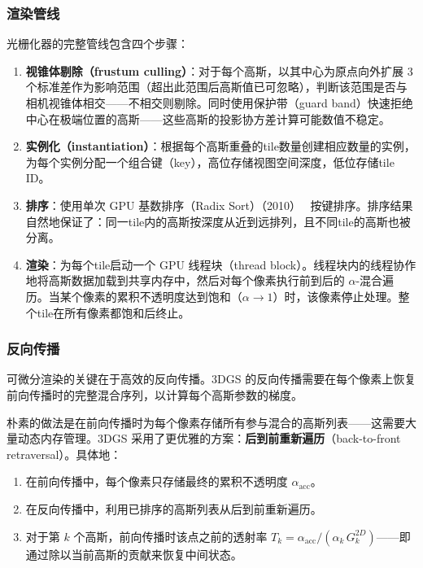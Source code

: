 \subsubsection{渲染管线}

光栅化器的完整管线包含四个步骤：

\begin{enumerate}
\item \textbf{视锥体剔除（frustum culling）}：对于每个高斯，以其中心为原点向外扩展 3 个标准差作为影响范围（超出此范围后高斯值已可忽略），判断该范围是否与相机视锥体相交——不相交则剔除。同时使用保护带（guard band）快速拒绝中心在极端位置的高斯——这些高斯的投影协方差计算可能数值不稳定。
\item \textbf{实例化（instantiation）}：根据每个高斯重叠的tile数量创建相应数量的实例，为每个实例分配一个组合键（key），高位存储视图空间深度，低位存储tile ID。
\item \textbf{排序}：使用单次 GPU 基数排序（Radix Sort）（2010）~\cite{merrill2010revisiting} 按键排序。排序结果自然地保证了：同一tile内的高斯按深度从近到远排列，且不同tile的高斯也被分离。
\item \textbf{渲染}：为每个tile启动一个 GPU 线程块（thread block）。线程块内的线程协作地将高斯数据加载到共享内存中，然后对每个像素执行前到后的 $\alpha$-混合遍历。当某个像素的累积不透明度达到饱和（$\alpha \to 1$）时，该像素停止处理。整个tile在所有像素都饱和后终止。
\end{enumerate}

\subsubsection{反向传播}

可微分渲染的关键在于高效的反向传播。3DGS 的反向传播需要在每个像素上恢复前向传播时的完整混合序列，以计算每个高斯参数的梯度。

朴素的做法是在前向传播时为每个像素存储所有参与混合的高斯列表——这需要大量动态内存管理。3DGS 采用了更优雅的方案：\textbf{后到前重新遍历}（back-to-front retraversal）。具体地：
\begin{enumerate}
\item 在前向传播中，每个像素只存储最终的累积不透明度 $\alpha_{\mathrm{acc}}$。
\item 在反向传播中，利用已排序的高斯列表从后到前重新遍历。
\item 对于第 $k$ 个高斯，前向传播时该点之前的透射率 $T_k = \alpha_{\mathrm{acc}} / (\alpha_k \, G_k^{2D})$——即通过除以当前高斯的贡献来恢复中间状态。
\end{enumerate}

